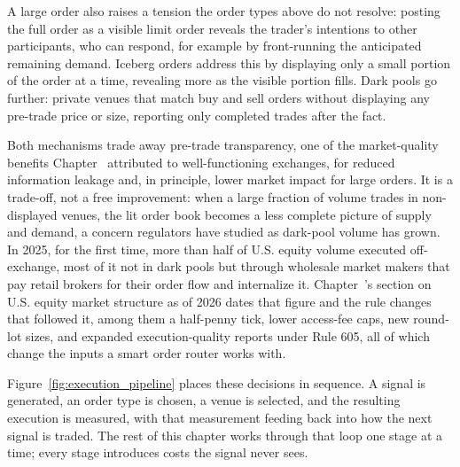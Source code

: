 \documentclass[../ai_in_finance]{subfiles}
\begin{document}
A large order also raises a tension the order types above do not resolve: posting the full order as a visible limit order reveals the trader's intentions to other participants, who can respond, for example by front-running the anticipated remaining demand. Iceberg orders address this by displaying only a small portion of the order at a time, revealing more as the visible portion fills. Dark pools go further: private venues that match buy and sell orders without displaying any pre-trade price or size, reporting only completed trades after the fact.

Both mechanisms trade away pre-trade transparency, one of the market-quality benefits Chapter~ attributed to well-functioning exchanges, for reduced information leakage and, in principle, lower market impact for large orders. It is a trade-off, not a free improvement: when a large fraction of volume trades in non-displayed venues, the lit order book becomes a less complete picture of supply and demand, a concern regulators have studied as dark-pool volume has grown. In 2025, for the first time, more than half of U.S. equity volume executed off-exchange, most of it not in dark pools but through wholesale market makers that pay retail brokers for their order flow and internalize it. Chapter~'s section on U.S. equity market structure as of 2026 dates that figure and the rule changes that followed it, among them a half-penny tick, lower access-fee caps, new round-lot sizes, and expanded execution-quality reports under Rule 605, all of which change the inputs a smart order router works with.

Figure~\ref{fig:execution_pipeline} places these decisions in sequence. A signal is generated, an order type is chosen, a venue is selected, and the resulting execution is measured, with that measurement feeding back into how the next signal is traded. The rest of this chapter works through that loop one stage at a time; every stage introduces costs the signal never sees.
\end{document}

